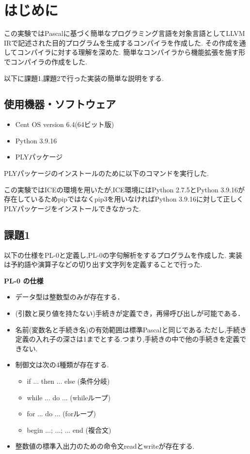 \documentclass[main]{subfiles}
\begin{document}
\chapter{はじめに}
この実験ではPascalに基づく簡単なプログラミング言語を対象言語としてLLVM IRで記述された目的プログラムを生成するコンパイラを作成した.
その作成を通してコンパイラに対する理解を深めた.
簡単なコンパイラから機能拡張を施す形でコンパイラの作成をした.

以下に課題1,課題2で行った実装の簡単な説明をする.

\section{使用機器・ソフトウェア}
\begin{itemize}
    \item Cent OS version 6.4(64ビット版)
    \item Python 3.9.16
    \item PLYパッケージ
\end{itemize}
PLYパッケージのインストールのために以下のコマンドを実行した.
\begin{oframed}
\begin{verbatim}% pip3 install --user ply\end{verbatim}
\end{oframed}
この実験ではICEの環境を用いたが,ICE環境にはPython 2.7.5とPython 3.9.16が存在しているためpipではなくpip3を用いなければPython 3.9.16に対して正しくPLYパッケージをインストールできなかった.
\section{課題1}
以下の仕様をPL-0と定義し,PL-0の字句解析をするプログラムを作成した.
実装は予約語や演算子などの切り出す文字列を定義することで行った.
\begin{oframed}
    \label{fig:PL-0}
    \textbf{PL-0 の仕様}
    \begin{itemize}
        \item データ型は整数型のみが存在する．
        \item (引数と戻り値を持たない)手続きが定義でき，再帰呼び出しが可能である．
        \item 名前(変数名と手続き名)の有効範囲は標準Pascalと同じである.ただし,手続き定義の入れ子の深さは1までとする.つまり,手続きの中で他の手続きを定義できない.
        \item 制御文は次の4種類が存在する.
        \begin{itemize}
            \item if ... then ... else (条件分岐)
            \item while ... do ... (whileループ)
            \item for ... do ... (forループ)
            \item begin ...; ...; ... end (複合文)
        \end{itemize}
        \item 整数値の標準入出力のための命令文readとwriteが存在する.
    \end{itemize}
\end{oframed}
\end{document}
